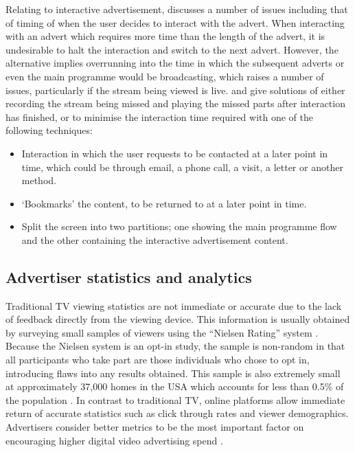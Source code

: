 	Relating to interactive advertisement, \citet{integrated-approach-advertising} discusses a number of issues including that of timing of when the user decides to interact with the advert. When interacting with an advert which requires more time than the length of the advert, it is undesirable to halt the interaction and switch to the next advert. However, the alternative implies overrunning into the time in which the subsequent adverts or even the main programme would be broadcasting, which raises a number of issues, particularly if the stream being viewed is live. \citet{integrated-approach-advertising} and \citet{personalised_interactive_tv_advertising} give solutions of either recording the stream being missed and playing the missed parts after interaction has finished, or to minimise the interaction time required with one of the following techniques:
	\begin{itemize}
		\item Interaction in which the user requests to be contacted at a later point in time, which could be through email, a phone call, a visit, a letter or another method.
		\item `Bookmarks' the content, to be returned to at a later point in time.
		\item Split the screen into two partitions; one showing the main programme flow and the other containing the interactive advertisement content. 
	\end{itemize}



	

\subsection{Advertiser statistics and analytics}
	\label{sec:background_stats}

	Traditional TV viewing statistics are not immediate or accurate due to the lack of feedback directly from the viewing device. This information is usually obtained by surveying small samples of viewers using the ``Nielsen Rating'' system \citep{nielsen-sample}. Because the Nielsen system is an opt-in study, the sample is non-random in that all participants who take part are those individuals who chose to opt in, introducing flaws into any results obtained. This sample is also extremely small at approximately 37,000 homes in the USA which accounts for less than 0.5\% of the population \citep{nielsen-sample}. In contrast to traditional TV, online platforms allow immediate return of accurate statistics such as click through rates and viewer demographics. Advertisers consider better metrics to be the most important factor on encouraging higher digital video advertising spend \citep{brightroll-report}.


